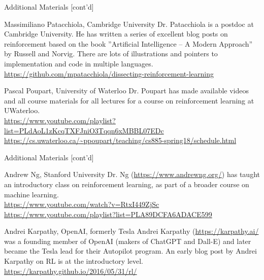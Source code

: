 \documentclass[ignorenonframetext,xcolor=x11names]{beamer}
\begin{document}
\begin{frame}[label=full]{Additional Materials \small [cont'd]}
\footnotesize
\begin{block}{Massimiliano Patacchiola, Cambridge University} 
Dr. Patacchiola is a postdoc at Cambridge University. He has written a series of excellent blog posts on reinforcement based on the book ''Artificial Intelligence -- A Modern Approach'' by Russell and Norvig. There are lots of illustrations and pointers to implementation and code in multiple languages. \\
\vspace{\baselineskip}
\url{https://github.com/mpatacchiola/dissecting-reinforcement-learning}
\end{block}

\begin{block}{Pascal Poupart, University of Waterloo}
Dr. Poupart has made available videos and all course materials for all lectures for a course on reinforcement learning at UWaterloo. \\
\vspace{.5\baselineskip}
\url{https://www.youtube.com/playlist?list=PLdAoL1zKcqTXFJniO3Tqqn6xMBBL07EDc} \\
\vspace{.5\baselineskip}
\url{https://cs.uwaterloo.ca/~ppoupart/teaching/cs885-spring18/schedule.html}
\end{block}
\end{frame}

\begin{frame}[label=full]{Additional Materials \small [cont'd]}
\footnotesize
\begin{block}{Andrew Ng, Stanford University}
Dr. Ng (\url{https://www.andrewng.org/}) has taught an introductory class on reinforcement learning, as part of a broader course on machine learning. \\
\vspace{\baselineskip}
\url{https://www.youtube.com/watch?v=RtxI449ZjSc} \\
\vspace{.5\baselineskip}
\url{https://www.youtube.com/playlist?list=PLA89DCFA6ADACE599}
\end{block}

\begin{block}{Andrei Karpathy, OpenAI, formerly Tesla}
Andrei Karpathy (\url{https://karpathy.ai/} was a founding member of OpenAI (makers of ChatGPT and Dall-E) and later became the Tesla lead for their Autopilot program. An early blog post by Andrei Karpathy on RL is at the introductory level. \\
\vspace{.5\baselineskip}
\url{https://karpathy.github.io/2016/05/31/rl/}
\end{block}
\end{frame}
\end{document}
